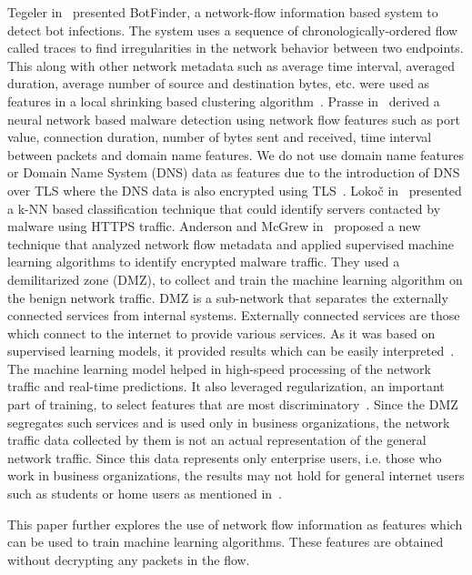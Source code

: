 Tegeler \etal in~\cite{TegelerFVK12} presented BotFinder, a network-flow information based system to detect bot infections. The system uses a sequence of chronologically-ordered flow called traces to find irregularities in the network behavior between two endpoints. This along with other network metadata such as average time interval, averaged duration, average number of source and destination bytes, etc. were used as features in a local shrinking based clustering algorithm~\cite{WangQZ07}. Prasse \etal in~\cite{PrasseMPHS17} derived a neural network based malware detection using network flow features such as port value, connection duration, number of bytes sent and received, time interval between packets and domain name features. We do not use domain name features or Domain Name System (DNS) data as features due to the introduction of DNS over TLS where the DNS data is also encrypted using TLS~\cite{Hu16a}. Loko\v c \etal in~\cite{LokocKCSP16} presented a k-NN based classification technique that could identify servers contacted by malware using HTTPS traffic. Anderson and McGrew in~\cite{AndersonM17} proposed a new technique that analyzed network flow metadata and applied supervised machine learning algorithms to identify encrypted malware traffic. They used a demilitarized zone (DMZ), to collect and train the machine learning algorithm on the benign network traffic. DMZ is a sub-network that separates the externally connected services from internal systems. Externally connected services are those which connect to the internet to provide various services. As it was based on supervised learning models, it provided results which can be easily interpreted~\cite{SommerP10}. The machine learning model helped in high-speed processing of the network traffic and real-time predictions. It also leveraged regularization, an important part of training, to select features that are most discriminatory~\cite{HastieTF09}. Since the DMZ segregates such services and is used only in business organizations, the network traffic data collected by them is not an actual representation of the general network traffic. Since this data represents only enterprise users, i.e. those who work in business organizations, the results may not hold for general internet users such as students or home users as mentioned in~\cite{AndersonM17}.

This paper further explores the use of network flow information as features which can be used to train machine learning algorithms. These features are obtained without decrypting any packets in the flow.
